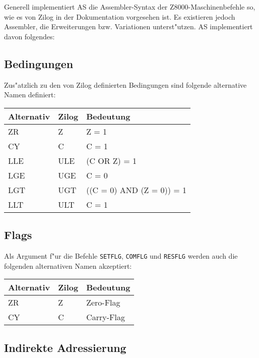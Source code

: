 \documentclass[12pt,a4paper,twoside]{report}
\newcommand{\tty}[1]{{\tt #1}}
\begin{document}
Generell implementiert AS die Assembler-Syntax der Z8000-Maschinenbefehle
so, wie es von Zilog in der Dokumentation vorgesehen ist.  Es existieren
jedoch Assembler, die Erweiterungen bzw. Variationen unterst"utzen.  AS
implementiert davon folgendes:

\subsection{Bedingungen}

Zus"atzlich zu den von Zilog definierten Bedingungen sind folgende alternative
Namen definiert:

\begin{center}\begin{tabular}{|l|l|l|}
\hline
Alternativ & Zilog & Bedeutung \\
\hline
\hline
ZR         & Z     & Z = 1 \\
CY         & C     & C = 1 \\
LLE        & ULE   & (C OR Z) = 1 \\
LGE        & UGE   & C = 0 \\
LGT        & UGT   & ((C = 0) AND (Z = 0)) = 1 \\
LLT        & ULT   & C = 1 \\
\hline
\end{tabular}\end{center}

\subsection{Flags}

Als Argument f"ur die Befehle \tty{SETFLG}, \tty{COMFLG} und \tty{RESFLG} werden
auch die folgenden alternativen Namen akzeptiert:

\begin{center}\begin{tabular}{|l|l|l|}
\hline
Alternativ & Zilog & Bedeutung \\
\hline
\hline
ZR         & Z     & Zero-Flag \\
CY         & C     & Carry-Flag \\
\hline
\end{tabular}\end{center}

\subsection{Indirekte Adressierung}
\end{document}

